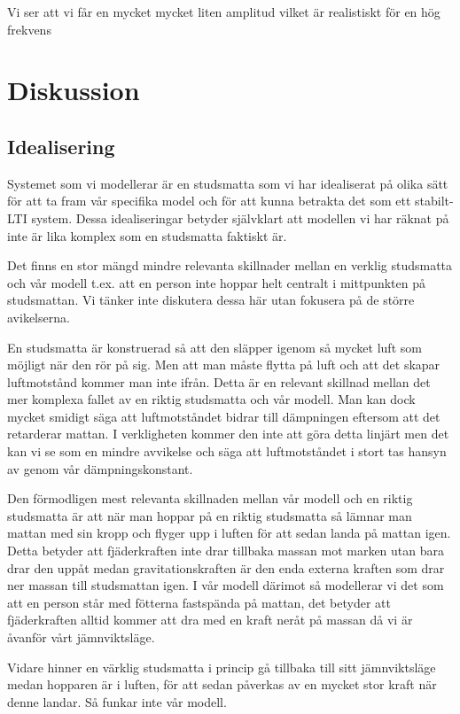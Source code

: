\documentclass[10pt,a4paper]{article}
\begin{document}
Vi ser att vi får en mycket mycket liten amplitud vilket är realistiskt för en hög frekvens

\section{Diskussion}

\subsection{Idealisering}
Systemet som vi modellerar är en studsmatta som vi har idealiserat på olika sätt för att ta fram vår specifika model och för att kunna betrakta det som ett stabilt-LTI system. Dessa idealiseringar betyder självklart att modellen vi har räknat på inte är lika komplex som en studsmatta faktiskt är. 

Det finns en stor mängd mindre relevanta skillnader mellan en verklig studsmatta och vår modell t.ex. att en person inte hoppar helt centralt i mittpunkten på studsmattan. Vi tänker inte diskutera dessa här utan fokusera på de större avikelserna.

En studsmatta är konstruerad så att den släpper igenom så mycket luft som möjligt när den rör på sig. Men att man måste flytta på luft och att det skapar luftmotstånd kommer man inte ifrån. Detta är en relevant skillnad mellan det mer komplexa fallet av en riktig studsmatta och vår modell. Man kan dock mycket smidigt säga att luftmotståndet bidrar till dämpningen eftersom att det retarderar mattan. I verkligheten kommer den inte att göra detta linjärt men det kan vi se som en mindre avvikelse och säga att luftmotståndet i stort tas hansyn av genom vår dämpningskonstant.

Den förmodligen mest relevanta skillnaden mellan vår modell och en riktig studsmatta är att när man hoppar på en riktig studsmatta så lämnar man mattan med sin kropp och flyger upp i luften för att sedan landa på mattan igen. Detta betyder att fjäderkraften inte drar tillbaka massan mot marken utan bara drar den uppåt medan gravitationskraften är den enda externa kraften som drar ner massan till studsmattan igen. I vår modell därimot så modellerar vi det som att en person står med fötterna fastspända på mattan, det betyder att fjäderkraften alltid kommer att dra med en kraft neråt på massan då vi är åvanför vårt jämnviktsläge.

Vidare hinner en värklig studsmatta i princip gå tillbaka till sitt jämnviktsläge medan hopparen är i luften, för att sedan påverkas av en mycket stor kraft när denne landar. Så funkar inte vår modell.
\end{document}
